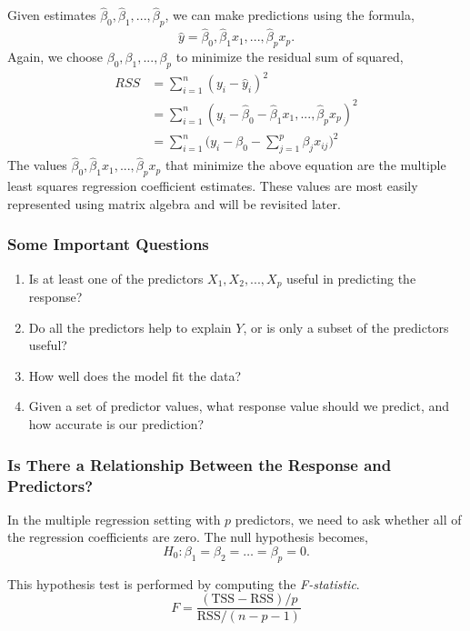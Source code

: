 \documentclass{article}
\numberwithin{equation}{section}
\begin{document}
Given estimates $\hat \beta_0, \hat \beta_1,..., \hat \beta_p$, we can make predictions using the formula,
\begin{equation}
     \hat y= \hat \beta_0, \hat \beta_1 x_1,..., \hat \beta_p x_p.
\end{equation}
Again, we choose $\beta_0, \beta_1,...,\beta_p$ to minimize the residual sum of squared,
\begin{align*} \label{eq:RSS-sum}
    RSS &= \sum_{i=1}^{n} (y_i - \hat y_i)^2 \\
    &=  \sum_{i=1}^{n}(y_i - \hat \beta_0 - \hat \beta_1 x_1,..., \hat \beta_p x_p)^2 \\
    &= \sum_{i=1}^n \Bigg ( y_i - \beta_0 - \sum_{j=1}^p \beta_j x_{ij} \Bigg)^2
\end{align*}
The values $\hat \beta_0, \hat \beta_1 x_1,..., \hat \beta_p x_p$ that minimize the above equation are the multiple least squares regression coefficient estimates. These values are most easily represented using matrix algebra and will be revisited later.

\subsubsection{Some Important Questions}
\begin{enumerate}
    \item Is at least one of the predictors $X_1, X_2,...,X_p$ useful in predicting the response?
    \item Do all the predictors help to explain $Y$, or is only a subset of the predictors useful?
    \item How well does the model fit the data? 
    \item Given a set of predictor values, what response value should we predict, and how accurate is our prediction?
\end{enumerate}

\subsubsection*{Is There a Relationship Between the Response and Predictors?}
In the multiple regression setting with $p$ predictors, we need to ask whether all of the regression coefficients are zero. The null hypothesis becomes,
\begin{equation}
    H_0 : \beta_1 = \beta_2 = \dots = \beta_p = 0.
\end{equation}

This hypothesis test is performed by computing the \textit{F-statistic}.
\begin{equation}
    F = \frac{(\text{TSS} - \text{RSS})/p }{\text{RSS}/ (n-p-1)}
\end{equation}
\end{document}

